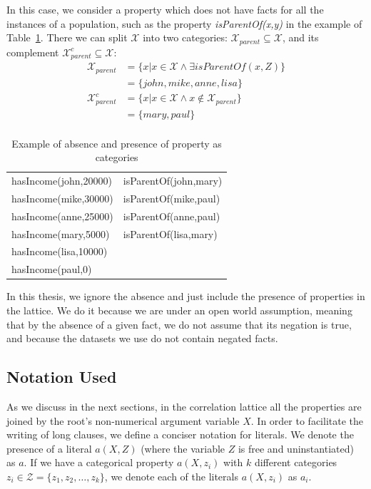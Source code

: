 In this case, we consider a property which does not have facts for all the instances of a population, such as the
property \emph{isParentOf(x,y)} in the example of Table~\ref{tab:cat3}. There we can split $\mathcal{X}$ into two
categories: $\mathcal{X}_{parent} \subseteq \mathcal{X}$, and its complement $\mathcal{X}_{parent}^{c} \subseteq
\mathcal{X}$:
\begin{align*}
 \mathcal{X}_{parent}&=\{x| x \in \mathcal{X} \land \exists isParentOf(x,Z)\} \\
  &=\{john,mike,anne,lisa\} \\
 \mathcal{X}_{parent}^{c}&=\{x| x \in \mathcal{X} \land x \not \in \mathcal{X}_{parent} \} \\
  &=\{mary,paul\} \\
\end{align*}

\begin{table}[h!]
 \begin{center}
 \caption{Example of absence and presence of property as categories}
  \begin{tabular}{l l}
    \toprule
    hasIncome(john,20000) & isParentOf(john,mary) \\
    hasIncome(mike,30000) & isParentOf(mike,paul) \\
    hasIncome(anne,25000) & isParentOf(anne,paul) \\
    hasIncome(mary,5000)  & isParentOf(lisa,mary) \\
    hasIncome(lisa,10000) & 			\\
    hasIncome(paul,0)	  & 			\\
    \bottomrule
  \end{tabular}
 \label{tab:cat3}
 \end{center}
\end{table}

In this thesis, we ignore the absence and just include the presence of properties in the lattice. We do it because we
are under an open world assumption, meaning that by the absence of a given fact, we do not assume that its negation is
true, and because the datasets we use do not contain negated facts.

\subsection{Notation Used}
\label{sec:notation}

As we discuss in the next sections, in the correlation lattice all the properties are joined by the root's
non-numerical argument variable $X$. In order to facilitate the writing of long clauses, we define a conciser notation
for literals. We denote the presence of a literal $a(X,Z)$ (where the variable $Z$ is free and uninstantiated)
as $a$. If we have a categorical property $a(X,z_i)$ with $k$ different categories $z_i \in \mathcal{Z}=\{
z_1,z_2,\ldots,z_k\}$, we denote each of the literals $a(X,z_i)$ as $a_i$.

